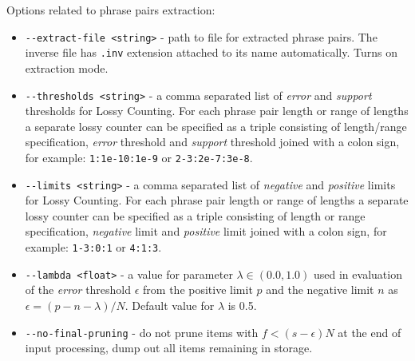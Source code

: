 Options related to phrase pairs extraction:
\begin{itemize}
 \item \verb|--extract-file <string>| - path to file for extracted phrase pairs.
  The inverse file has \texttt{.inv} extension attached to its name automatically.
  Turns on extraction mode.
 \item \verb|--thresholds <string>| - a comma separated list of \emph{error} and \emph{support}
  thresholds for Lossy Counting. For each phrase pair length or range of lengths
  a separate lossy counter can be specified as a triple consisting of length/range
  specification, \emph{error} threshold and \emph{support} threshold joined with
  a colon sign, for example: \texttt{1:1e-10:1e-9} or \texttt{2-3:2e-7:3e-8}.
 \item \verb|--limits <string>| - a comma separated list of \emph{negative} and \emph{positive}
  limits for Lossy Counting. For each phrase pair length or range of lengths
  a separate lossy counter can be specified as a triple consisting of length or range
  specification, \emph{negative} limit and \emph{positive} limit joined with
  a colon sign, for example: \texttt{1-3:0:1} or \texttt{4:1:3}.
 \item \verb|--lambda <float>| - a value for parameter $\lambda \in (0.0, 1.0)$
  used in evaluation of the \emph{error} threshold $\epsilon$ from
  the positive limit $p$ and the negative limit $n$ as $\epsilon = (p - n - \lambda) / N$.
  Default value for $\lambda$ is 0.5.
 \item \verb|--no-final-pruning| - do not prune items with $f < (s - \epsilon)N$
  at the end of input processing, dump out all items remaining in storage.
\end{itemize}

